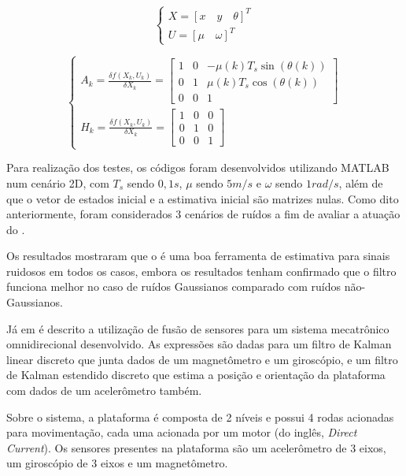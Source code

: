 \documentclass[acronym, symbols, table]{fei}
\begin{document}
	\begin{equation}\label{eq:trab_relacionados_vetor_estados_1}
		\begin{cases}
			X = [x \quad y \quad \theta]^T \\
			U = [\mu \quad \omega]^T
		\end{cases}
	\end{equation}
	
	\begin{equation}\label{eq:trab_relacionados_matrizes_jacobianas}
		\begin{cases}
			A_k = \frac{\delta f(X_k, U_k)}{\delta X_k} = \begin{bmatrix}
				1 & 0 & -\mu(k)T_s\sin{(\theta(k))} \\
				0 & 1 & \mu(k)T_s\cos{(\theta(k))}  \\
				0 & 0 & 1
			\end{bmatrix} \\[30pt]
			
			H_k = \frac{\delta f(X_k, U_k)}{\delta X_k} = 
			\begin{bmatrix}
				1 & 0 & 0 \\
				0 & 1 & 0 \\
				0 & 0 & 1 
			\end{bmatrix}		
		\end{cases}
	\end{equation}
	
	Para realização dos testes, os códigos foram desenvolvidos utilizando MATLAB num cenário 2D, com $T_s$ sendo $0,1s$, $\mu$ sendo $5m/s$ e $\omega$ sendo $1rad/s$, além de que o vetor de estados inicial e a estimativa inicial são matrizes nulas. Como dito anteriormente, foram considerados 3 cenários de ruídos a fim de avaliar a atuação do .
	
	Os resultados mostraram que o  é uma boa ferramenta de estimativa para sinais ruidosos em todos os casos, embora os resultados tenham confirmado que o filtro funciona melhor no caso de ruídos Gaussianos comparado com ruídos não-Gaussianos.
	
	Já em \textcite{korotaj2021kalman} é descrito a utilização de fusão de sensores para um sistema mecatrônico omnidirecional desenvolvido. As expressões são dadas para um filtro de Kalman linear discreto que junta dados de um magnetômetro e um giroscópio, e um filtro de Kalman estendido discreto que estima a posição e orientação da plataforma com dados de um acelerômetro também.
	
	Sobre o sistema, a plataforma é composta de 2 níveis e possui 4 rodas acionadas para movimentação, cada uma acionada por um motor  (do inglês, \textit{Direct Current}). Os sensores presentes na plataforma são um acelerômetro de 3 eixos, um giroscópio de 3 eixos e um magnetômetro.
	
\end{document}
